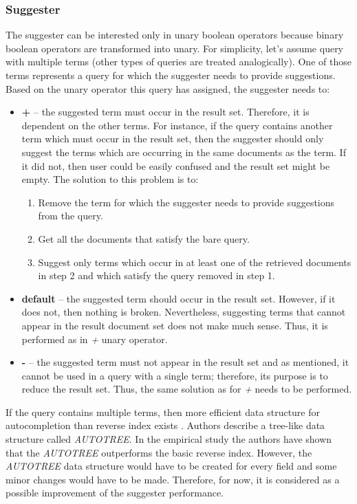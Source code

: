 \subsubsection{Suggester}
The suggester can be interested only in unary boolean operators because binary boolean operators are transformed into unary.
For simplicity, let's assume query with multiple terms (other types of queries are treated analogically).
One of those terms represents a query for which the suggester needs to provide suggestions.
Based on the unary operator this query has assigned, the suggester needs to:
\begin{itemize}
    \item \textbf{+} – the suggested term must occur in the result set. Therefore, it is dependent on the other terms.
    For instance, if the query contains another term which must occur in the result set, then the suggester should only
    suggest the terms which are occurring in the same documents as the term. If it did not, then user could be easily
    confused and the result set might be empty. The solution to this problem is to:
    \begin{enumerate}
        \item Remove the term for which the suggester needs to provide suggestions from the query.
        \item Get all the documents that satisfy the bare query.
        \item Suggest only terms which occur in at least one of the retrieved documents in step 2 and which satisfy the
        query removed in step 1.
    \end{enumerate}
    \item \textbf{default} – the suggested term should occur in the result set. However, if it does not, then nothing is broken.
    Nevertheless, suggesting terms that cannot appear in the result document set does not make much sense. Thus, it is performed
    as in \textit{+} unary operator.
    \item \textbf{-} – the suggested term must not appear in the result set and as mentioned, it cannot be used in a
    query with a single term; therefore, its purpose is to reduce the result set. Thus, the same solution as for \textit{+}
    needs to be performed.
\end{itemize}


If the query contains multiple terms, then more efficient data structure for autocompletion than reverse index exists
\citep{Bast06output-sensitiveautocompletion}. Authors describe a tree-like data structure called \textit{AUTOTREE}. In the
empirical study the authors have shown that the \textit{AUTOTREE} outperforms the basic reverse index. However,
the \textit{AUTOTREE} data structure would have to be created for every field and some minor changes would have to be made.
Therefore, for now, it is considered as a possible improvement of the suggester performance.


